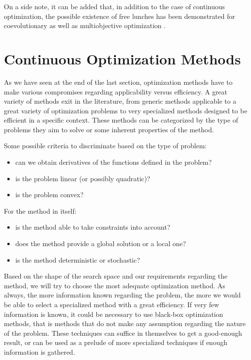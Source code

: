 On a side note, it can be added that, in addition to the case of continuous optimization, the possible existence of free lunches has been demonstrated for coevolutionary \cite{1545946} as well as multiobjective optimization \cite{1299403}.

\section{Continuous Optimization Methods}

As we have seen at the end of the last section, optimization methods have to make various compromises regarding applicability versus efficiency.  A great variety of methods exit in the literature, from generic methods applicable to a great variety of optimization problems to very specialized methods designed to be efficient in a specific context. These methods can be categorized by the type of problems they aim to solve or some inherent properties of the method.

Some possible criteria to discriminate based on the type of problem:
\begin{itemize}
\item can we obtain derivatives of the functions defined in the problem?
\item is the problem linear (or possibly quadratic)?
\item is the problem convex?
\end{itemize}

For the method in itself:
\begin{itemize}
\item is the method able to take constraints into account?
\item does the method provide a global solution or a local one?
\item is the method deterministic or stochastic?
\end{itemize}

Based on the shape of the search space and our requirements regarding the method, we will try to choose the most adequate optimization method. As always, the more information known regarding the problem, the more we would be able to select a specialized method with a great efficiency. If very few information is known, it could be necessary to use black-box optimization methods, that is methods that do not make any assumption regarding the nature of the problem. These techniques can suffice in themselves to get a good-enough result, or can be used as a prelude of more specialized techniques if enough information is gathered.

